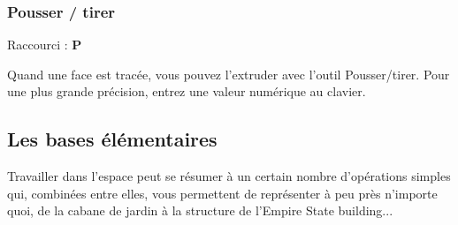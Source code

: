 \documentclass[a4paper,12pt,french]{sphinxmanual}
\begin{document}
\subsubsection{Pousser / tirer}
\label{su/intro-su:pousser-tirer}
Raccourci : \textbf{P}

Quand une face est tracée, vous pouvez l'extruder avec l'outil Pousser/tirer. Pour une plus grande précision, entrez une valeur numérique au clavier.


\subsection{Les bases élémentaires}
\label{su/intro-su:les-bases-elementaires}
Travailler dans l'espace peut se résumer à un certain nombre d'opérations simples qui, combinées entre elles, vous permettent de représenter à peu près n'importe quoi, de la cabane de jardin à la structure de l'Empire State building...
\end{document}
